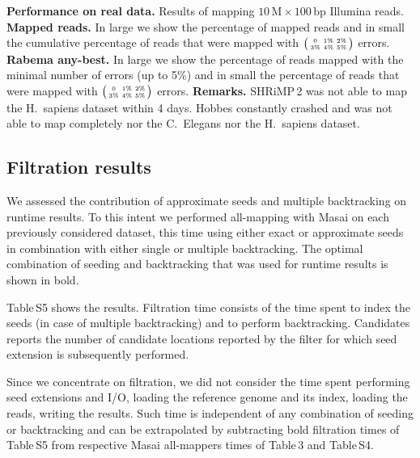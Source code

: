 \begin{table*}[t]
  \caption[Performance on real data]{
    \label{tab:Runtime}
    \textbf{Performance on real data.}
	Results of mapping $10\,\text{M}\times 100\,\text{bp}$ Illumina reads.
	\textbf{Mapped reads.}
	In large we show the percentage of mapped reads and in small the cumulative percentage of reads that were mapped with $\bigl(\begin{smallmatrix}\mbox{\tiny 0}&\mbox{\tiny 1\%}&\mbox{\tiny 2\%}\\\mbox{\tiny 3\%}&\mbox{\tiny 4\%}&\mbox{\tiny 5\%}\end{smallmatrix}\bigr)$ errors.
	\textbf{Rabema any-best.}
    In large we show the percentage of reads mapped with the minimal number of errors (up to 5\%) and in small the percentage of reads that were mapped with $\bigl(\begin{smallmatrix}\mbox{\tiny 0}&\mbox{\tiny 1\%}&\mbox{\tiny 2\%}\\\mbox{\tiny 3\%}&\mbox{\tiny 4\%}&\mbox{\tiny 5\%}\end{smallmatrix}\bigr)$ errors.
	\textbf{Remarks.}
    SHRiMP\,2 was not able to map the H.~sapiens dataset within 4 days.
    Hobbes constantly crashed and was not able to map completely nor the C.~Elegans nor the H.~sapiens dataset.
  }
	\vspace{-3mm}
	\center
	\sffamily
	\resizebox{1.0\textwidth}{!}
	{
		\renewcommand{\tabcolsep}{0.8ex}
		
	}
\end{table*}


\subsection{Filtration results}

We assessed the contribution of approximate seeds and multiple backtracking on runtime results.
To this intent we performed all-mapping with Masai on each previously considered dataset, this time using either exact or approximate seeds in combination with either single or multiple backtracking.
The optimal combination of seeding and backtracking that was used for runtime results is shown in bold.

Table\,S5 shows the results.
Filtration time consists of the time spent to index the seeds (in case of multiple backtracking) and to perform backtracking.
Candidates reports the number of candidate locations reported by the filter for which seed extension is subsequently performed.

Since we concentrate on filtration, we did not consider the time spent performing seed extensions and I/O, \ie loading the reference genome and its index, loading the reads, writing the results.
Such time is independent of any combination of seeding or backtracking and can be extrapolated by subtracting bold filtration times of Table\,S5 from respective Masai all-mappers times of Table\,3 and Table\,S4.

